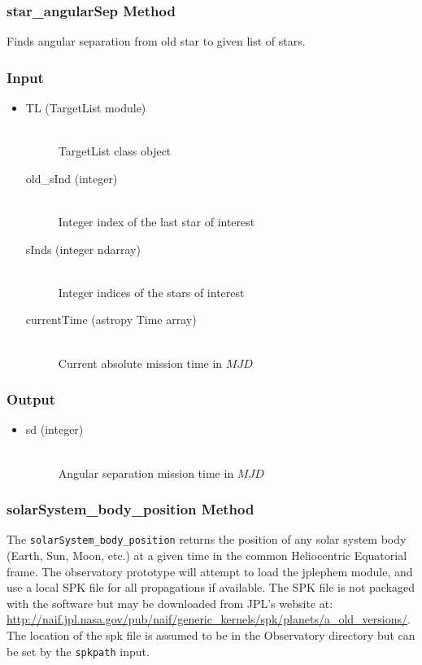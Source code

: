 \documentclass[cleanfoot]{asme2ej}
\begin{document}
\subsubsection{star\_angularSep Method} \label{sec:starangsep}
Finds angular separation from old star to given list of stars.
\subsubsection*{Input}
\begin{itemize}
\item
\begin{description}
    \item[TL (TargetList module)] \hfill \\ TargetList class object
    \item[old\_sInd (integer)] \hfill \\ Integer index of the last star of interest
    \item[sInds (integer ndarray)] \hfill \\ Integer indices of the stars of interest
    \item[currentTime (astropy Time array)] \hfill \\ Current absolute mission time in $ MJD $
\end{description}
\end{itemize}
\subsubsection*{Output}
\begin{itemize}
\item
\begin{description}
    \item[sd (integer)] \hfill \\ Angular separation mission time in $ MJD $
\end{description}
\end{itemize}

\subsubsection{solarSystem\_body\_position Method} \label{sec:ssbPosTask}
The \verb+solarSystem_body_position+ returns the position of any solar system body (Earth, Sun, Moon, etc.) at a given time in the common Heliocentric Equatorial frame.  The observatory prototype will attempt to load the jplephem module, and use a local SPK file for all propagations if available.  The SPK file is not packaged with the software but may be downloaded from JPL's website at: \url{http://naif.jpl.nasa.gov/pub/naif/generic_kernels/spk/planets/a_old_versions/}.  The location of the spk file is assumed to be in the Observatory directory but can be set by the \verb+spkpath+ input.  
\end{document}
